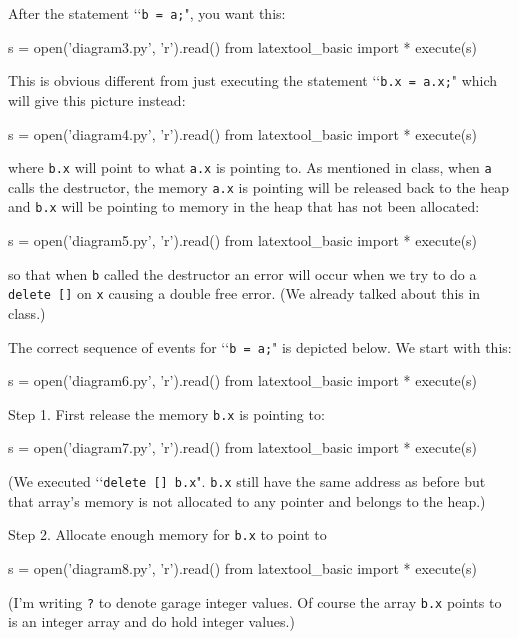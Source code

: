 After the statement \lq\lq \verb!b = a;!", you want this:

\begin{python}
s = open('diagram3.py', 'r').read()
from latextool_basic import *
execute(s)
\end{python}

This is obvious different from just executing the 
statement \lq\lq \verb!b.x = a.x;!" which will give this 
picture instead:

\begin{python}
s = open('diagram4.py', 'r').read()
from latextool_basic import *
execute(s)
\end{python}

where \verb!b.x! will point to what \verb!a.x! is pointing 
to.
As mentioned in class, when \verb!a! calls the destructor, the
memory \verb!a.x! is pointing will be released
back to the heap and \verb!b.x! 
will be pointing to
memory in the heap that has not been allocated:
\begin{python}
s = open('diagram5.py', 'r').read()
from latextool_basic import *
execute(s)
\end{python}

so that when \verb!b! called the destructor an error will occur 
when we try to do a \verb!delete []! on \verb!x!
causing a double free error.
(We already 
talked about this in class.) 

The correct sequence of events for \lq\lq\verb!b = a;!"
is depicted below.
We start with this:

\begin{python}
s = open('diagram6.py', 'r').read()
from latextool_basic import *
execute(s)
\end{python}

Step 1. First release the memory \verb!b.x! is pointing to:
\begin{python}
s = open('diagram7.py', 'r').read()
from latextool_basic import *
execute(s)
\end{python}
(We executed \lq\lq\verb!delete [] b.x!".
\verb!b.x! still have the same address as before
but that array's memory is not allocated to any pointer
and belongs to the heap.)

Step 2. Allocate enough memory for \verb!b.x! to point to  
\begin{python}
s = open('diagram8.py', 'r').read()
from latextool_basic import *
execute(s)
\end{python}
(I'm writing \verb!?! to denote garage integer values.
Of course the array \verb!b.x! points to is an
integer array and do hold integer values.)

